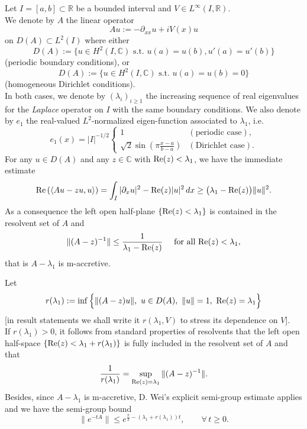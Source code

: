 \documentclass[12pt]{article}
\newcommand{\R}{\mathbb{R}}
\newcommand{\C}{\mathbb{C}}
\begin{document}
Let $I = [a,b] \subset \R$ be a bounded interval and $V \in L^\infty(I, \R).$\\
We denote by $A$ the linear operator
$$
A u := -\partial_{xx} u + iV(x) u
$$ 
on $D(A) \subset L^2(I)$ where either  
$$
D(A) := \Big\{ u \in H^2(I, \C) \text{ s.t. } u(a) = u(b), u'(a) = u'(b) \Big\}
$$
(periodic boundary conditions), or 
$$
D(A) := \Big\{ u \in H^2(I, \C) \text{ s.t. } u(a) = u(b) = 0 \Big\}
$$
(homogeneous Dirichlet conditions).\\
In both cases, we denote by $(\lambda_i)_{i \geq 1}$ the increasing 
sequence of real eigenvalues for the {\it Laplace} operator on $I$ 
with the same boundary conditions. We also denote by $e_1$ the  
real-valued $L^2$-normalized eigen-function associated to $\lambda_1$, i.e.
\begin{equation}\label{def:eigenf}
    e_1(x) =|I|^{-1/2} \left\{ 
\begin{array}{rl}
1 & (\text{periodic case}),\\
\sqrt{2}\sin(\pi \frac{x-a}{b-a}) & (\text{Dirichlet case}).
\end{array}
\right.
\end{equation}
For any $u \in D(A)$ and any $z \in \C$ 
with ${\rm Re}(z) < \lambda_1$, we have the immediate estimate
$$
{\rm Re}\left( \langle Au - zu, u \rangle \right) = \int_I |\partial_x u|^2 
- {\rm Re}(z) |u|^2 \,dx \geq \big(\lambda_1 -
{\rm Re}(z)\big) \|u\|^2. 
$$ As a consequence the left open half-plane $\{ {\rm Re}(z) < \lambda_1\}$ is contained 
in the resolvent set of $A$ and 
$$\|(A - z)^{-1}\| \leq \frac{1}{\lambda_1 - {\rm Re}(z)} \quad \text{  
for all } {\rm Re}(z) < \lambda_1,$$
that is $A - \lambda_1$ is m-accretive.

\medskip
Let  
\begin{equation}\label{eq:rlambda1}
r(\lambda_1) := \inf \Big\{ \|(A - z)u\|,\ u \in D(A),\ \|u\|=1,\ {\rm Re}(z) =
\lambda_1\Big\}
\end{equation}
[in result statements we shall write it $r(\lambda_1, V)$ to stress its dependence on
$V$].\\[2pt]
If $r(\lambda_1) > 0$,  
it follows from standard properties of resolvents that the left open half-space 
$\{{\rm Re}(z) < \lambda_1 + r(\lambda_1)\}$ is fully included in the resolvent 
set of $A$ and that 
\begin{equation}
\frac{1}{r(\lambda_1)} = \sup_{{\rm Re}(z) = \lambda_1} \|(A - z)^{-1}\|. 
\end{equation}Besides, since $A - \lambda_1$ is m-accretive, D. Wei's explicit semi-group 
estimate \cite{Wei21} applies and we have the semi-group bound
\begin{equation}\label{eq:weiineq}
\|e^{-tA}\| \leq e^{\frac{\pi}{2} - (\lambda_1 + r(\lambda_1))t}, \qquad \forall\,
t \geq 0.
\end{equation}
\end{document}
